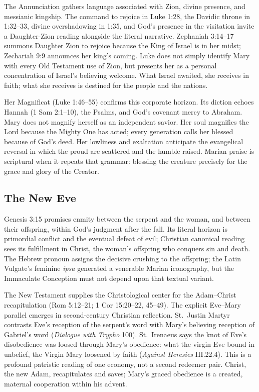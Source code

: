 The Annunciation gathers language associated with Zion, divine presence, and messianic kingship. The command to rejoice in Luke 1:28, the Davidic throne in 1:32--33, divine overshadowing in 1:35, and God's presence in the visitation invite a Daughter-Zion reading alongside the literal narrative. Zephaniah 3:14--17 summons Daughter Zion to rejoice because the King of Israel is in her midst; Zechariah 9:9 announces her king's coming. Luke does not simply identify Mary with every Old Testament use of Zion, but presents her as a personal concentration of Israel's believing welcome. What Israel awaited, she receives in faith; what she receives is destined for the people and the nations.

Her Magnificat (Luke 1:46--55) confirms this corporate horizon. Its diction echoes Hannah (1 Sam 2:1--10), the Psalms, and God's covenant mercy to Abraham. Mary does not magnify herself as an independent savior. Her soul magnifies the Lord because the Mighty One has acted; every generation calls her blessed because of God's deed. Her lowliness and exaltation anticipate the evangelical reversal in which the proud are scattered and the humble raised. Marian praise is scriptural when it repeats that grammar: blessing the creature precisely for the grace and glory of the Creator.

\subsection{The New Eve}

Genesis 3:15 promises enmity between the serpent and the woman, and between their offspring, within God's judgment after the fall. Its literal horizon is primordial conflict and the eventual defeat of evil; Christian canonical reading sees its fulfillment in Christ, the woman's offspring who conquers sin and death. The Hebrew pronoun assigns the decisive crushing to the offspring; the Latin Vulgate's feminine \emph{ipsa} generated a venerable Marian iconography, but the Immaculate Conception must not depend upon that textual variant.

The New Testament supplies the Christological center for the Adam--Christ recapitulation (Rom 5:12--21; 1 Cor 15:20--22, 45--49). The explicit Eve--Mary parallel emerges in second-century Christian reflection. St.~Justin Martyr contrasts Eve's reception of the serpent's word with Mary's believing reception of Gabriel's word (\emph{Dialogue with Trypho} 100). St.~Irenaeus says the knot of Eve's disobedience was loosed through Mary's obedience: what the virgin Eve bound in unbelief, the Virgin Mary loosened by faith (\emph{Against Heresies} III.22.4). This is a profound patristic reading of one economy, not a second redeemer pair. Christ, the new Adam, recapitulates and saves; Mary's graced obedience is a created, maternal cooperation within his advent.

